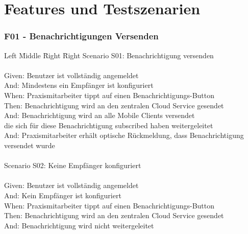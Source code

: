 
\section{Features und Testszenarien}

\subsubsection*{F01 - Benachrichtigungen Versenden}
\begin{tabbing}
    Left \= Middle \= Right \= Right \kill
    Scenario S01: \> \> \> Benachrichtigung versenden\\ \\
    Given:  \> \> \> Benutzer ist vollständig angemeldet\\
    And: \>    \> \> Mindestens ein Empfänger ist konfiguriert\\
    When:   \> \> \> Praxismitarbeiter tippt auf einen Benachrichtigungs-Button\\
    Then:   \> \> \> Benachrichtigung wird an den zentralen Cloud Service gesendet\\
    And: \>    \> \> Benachrichtigung wird an alle Mobile Clients versendet\\
    \> \>  \> die sich für diese Benachrichtigung subscribed haben weitergeleitet\\
    And:   \> \> \> Praxismitarbeiter erhält optische Rückmeldung, dass Benachrichtigung versendet wurde\\

    \\
    Scenario S02: \>  \> \> Keine Empfänger konfiguriert\\ \\
    Given:  \> \> \> Benutzer ist vollständig angemeldet\\
    And:  \> \>   \> Kein Empfänger ist konfiguriert\\
    When:  \> \>  \> Praxismitarbeiter tippt auf einen Benachrichtigungs-Button\\
    Then:  \> \>  \> Benachrichtigung wird an den zentralen Cloud Service gesendet\\
    And:  \> \>   \> Benachrichtigung wird nicht weitergeleitet\\

\end{tabbing}


